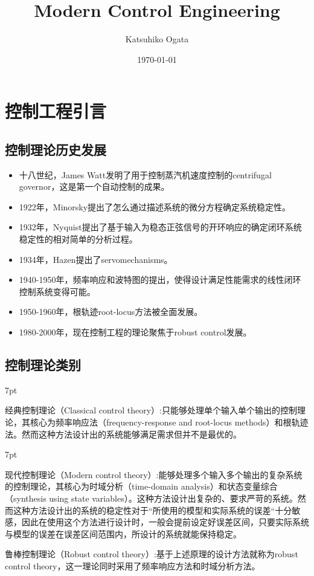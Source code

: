 \documentclass{article}
\title{Modern Control Engineering}
\author{Katsuhiko Ogata}%
\date{\today}
\numberwithin{equation}{section}
\numberwithin{figure}{section}
\newenvironment{formal}{%
\def\FrameCommand{%
\hspace{1pt}%
{\color{DarkBlue}\vrule width 2pt}%
{\color{formalshade}\vrule width 4pt}%
\colorbox{formalshade}%
}%
\MakeFramed{\advance\hsize-\width\FrameRestore}%
\noindent\hspace{-4.55pt}%
\begin{adjustwidth}{}{7pt}%
\vspace{2pt}\vspace{2pt}%
}
{%
\vspace{2pt}\end{adjustwidth}\endMakeFramed%
}
\begin{document}
\maketitle
\section{控制工程引言}
\subsection{控制理论历史发展}
\begin{itemize}
    \item 十八世纪，James Watt发明了用于控制蒸汽机速度控制的centrifugal governor，这是第一个自动控制的成果。
    \item 1922年，Minorsky提出了怎么通过描述系统的微分方程确定系统稳定性。
    \item 1932年，Nyquist提出了基于输入为稳态正弦信号的开环响应的确定闭环系统稳定性的相对简单的分析过程。
    \item 1934年，Hazen提出了servomechanisms。
    \item 1940-1950年，频率响应和波特图的提出，使得设计满足性能需求的线性闭环控制系统变得可能。
    \item 1950-1960年，根轨迹root-locus方法被全面发展。
    \item 1980-2000年，现在控制工程的理论聚焦于robust control发展。
\end{itemize}
\subsection{控制理论类别}
\begin{formal}
    \item 经典控制理论（Classical control theory）:只能够处理单个输入单个输出的控制理论，其核心为频率响应法（frequency-response and root-locus methods）和根轨迹法。然而这种方法设计出的系统能够满足需求但并不是最优的。
    \item 
\end{formal}
\begin{formal}
    \item 现代控制理论（Modern control theory）:能够处理多个输入多个输出的复杂系统的控制理论，其核心为时域分析（time-domain analysis）和状态变量综合（synthesis using state variables）。这种方法设计出复杂的、要求严苛的系统。然而这种方法设计出的系统的稳定性对于“所使用的模型和实际系统的误差“十分敏感，因此在使用这个方法进行设计时，一般会提前设定好误差区间，只要实际系统与模型的误差在误差区间范围内，所设计的系统就能保持稳定。
    \item 鲁棒控制理论（Robust control theory）:基于上述原理的设计方法就称为robust control theory，这一理论同时采用了频率响应方法和时域分析方法。
\end{formal}
\end{document}

